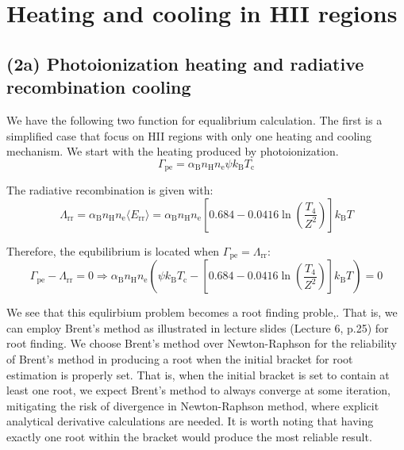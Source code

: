 \documentclass{article}
\begin{document}
\section{Heating and cooling in HII regions}
  \subsection{(2a) Photoionization heating and radiative recombination cooling}
    We have the following two function for equalibrium calculation. The first is a 
    simplified case that focus on HII regions with only one heating and cooling 
    mechanism. We start with the heating produced by photoionization.
    \begin{equation}
      \Gamma_\text{pe} 
      = \alpha_\text{B} n_\text{H} n_\text{e} \psi k_\text{B} T_\text{c}
    \end{equation}

    The radiative recombination is given with:
    \begin{equation}
      \Lambda_\text{rr} 
      = \alpha_\text{B} n_\text{H} n_\text{e} \langle E_\text{rr} \rangle
      = \alpha_\text{B} n_\text{H} n_\text{e} 
      \left[0.684-0.0416 \ln{\left(\frac{T_4}{Z^2}\right)}\right] k_\text{B} T
    \end{equation}

    Therefore, the equbilibrium is located when $\Gamma_\text{pe} = \Lambda_\text{rr}$:
    \begin{equation}
      \Gamma_\text{pe} - \Lambda_\text{rr} = 0
      \Rightarrow
      \alpha_\text{B} n_\text{H} n_\text{e}
      \left(
        \psi k_\text{B} T_\text{c} -  
        \left[0.684-0.0416 \ln{\left(\frac{T_4}{Z^2}\right)}\right] k_\text{B} T
      \right) = 0
    \end{equation}

    We see that this equlirbium problem becomes a root finding proble,. That is, we 
    can employ Brent's method as illustrated in lecture slides (Lecture 6, p.25) for 
    root finding. We choose Brent's method over Newton-Raphson for the reliability of
    Brent's method in producing a root when the initial bracket for root estimation
    is properly set. That is, when the initial bracket is set to contain at least one 
    root, we expect Brent's method to always converge at some iteration, mitigating the 
    risk of divergence in Newton-Raphson method, where explicit analytical derivative 
    calculations are needed. It is worth noting that having exactly one root within the 
    bracket would produce the most reliable result.
    
\end{document}
